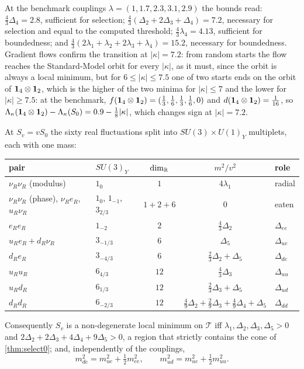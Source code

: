 At the benchmark couplings $\lambda=(1,1.7,2.3,3.1,2.9)$ the bounds read: $\tfrac43\Delta_4=2.8$, sufficient for selection; $\tfrac43(\Delta_2+2\Delta_3+\Delta_4)=7.2$,
necessary for selection and equal to the computed threshold; $\tfrac43\lambda_4=4.13$, sufficient for boundedness; and $\tfrac43(2\lambda_1+\lambda_2+2\lambda_3+\lambda_4)=15.2$,
necessary for boundedness. Gradient flows confirm the transition at $|\kappa|=7.2$: from random starts the flow reaches the Standard-Model orbit for every
$|\kappa|$, as it must, since the orbit is always a local minimum, but for $6\le|\kappa|\le7.5$ one of two starts ends on the orbit of $\mathbf 1_4\otimes\mathbf 1_2$, which is
the higher of the two minima for $|\kappa|\le7$ and the lower for $|\kappa|\ge7.5$: at the benchmark,
$f(\mathbf 1_4\otimes\mathbf 1_2)=(\tfrac13,\tfrac16,\tfrac13,\tfrac16,0)$ and $d(\mathbf 1_4\otimes\mathbf 1_2)=\tfrac1{16}$, so
$\Lambda_\kappa(\mathbf 1_4\otimes\mathbf 1_2)-\Lambda_\kappa(S_0)=0.9-\tfrac18|\kappa|$, which changes sign at $|\kappa|=7.2$.

\begin{theorem}
\label{thm:secondvar}
At $S_v=vS_0$ the sixty real fluctuations split into $SU(3)\times U(1)_Y$ multiplets, each with one mass:
\begin{center}
\small
\begin{tabular}{@{}llccl@{}}
\toprule
pair & $SU(3)_Y$ & $\dim_{\mathbb{R}}$ & $m^2/v^2$ & role\\
\midrule
$\nu_R\nu_R$ (modulus) & $1_0$ & $1$ & $4\lambda_1$ & radial\\
$\nu_R\nu_R$ (phase), $\nu_Re_R$, $u_R\nu_R$ & $1_0$, $1_{-1}$, $3_{2/3}$ & $1+2+6$ & $0$ & eaten\\
$e_Re_R$ & $1_{-2}$ & $2$ & $\tfrac43\Delta_2$ & $\Delta_{ee}$\\
$u_Re_R+d_R\nu_R$ & $3_{-1/3}$ & $6$ & $\Delta_5$ & $\Delta_{ue}$\\
$d_Re_R$ & $3_{-4/3}$ & $6$ & $\tfrac23\Delta_2+\Delta_5$ & $\Delta_{de}$\\
$u_Ru_R$ & $6_{4/3}$ & $12$ & $\tfrac43\Delta_3$ & $\Delta_{uu}$\\
$u_Rd_R$ & $6_{1/3}$ & $12$ & $\tfrac23\Delta_3+\Delta_5$ & $\Delta_{ud}$\\
$d_Rd_R$ & $6_{-2/3}$ & $12$ & $\tfrac49\Delta_2+\tfrac29\Delta_3+\tfrac49\Delta_4+\Delta_5$ & $\Delta_{dd}$\\
\bottomrule
\end{tabular}
\end{center}
Consequently $S_v$ is a non-degenerate local minimum on $\mathcal T$ iff $\lambda_1,\Delta_2,\Delta_3,\Delta_5>0$ and $2\Delta_2+2\Delta_3+4\Delta_4+9\Delta_5>0$, a region that
strictly contains the cone of \cref{thm:select0}; and, independently of the couplings,
\begin{equation}
\label{eq:sumrules}
m_{de}^2=m_{ue}^2+\tfrac12m_{ee}^2,\qquad m_{ud}^2=m_{ue}^2+\tfrac12m_{uu}^2 .
\end{equation}
\end{theorem}

